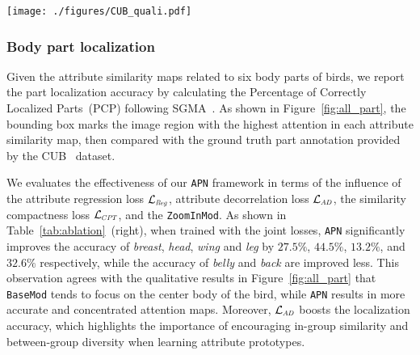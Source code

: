 \begin{figure*}[t]
  \centering
\texttt{[image: ./figures/CUB\_quali.pdf]}
    \caption{ Part and attribute localization on CUB.
        Left: 
        Attention maps for each body part of Mallard generated by our \texttt{APN}~(first row) and the baseline model \texttt{BaseMod} visualized by \texttt{CAM}~(\texttt{BaseMod(C)}, second row). Boxes mark out the area with the highest attention.
        Attention maps are min-max normalized for visualization.  Green~(purple) box outside the image indicates a correct~(incorrect) localization. 
}
  \label{fig:all_part}
\end{figure*}


\subsubsection{Body part localization}





Given the attribute similarity maps related to six body parts of birds, we report the part localization accuracy by calculating the Percentage of Correctly Localized Parts~(PCP) following SGMA~\citep{SGMA}. 
As shown in Figure~\ref{fig:all_part}, the bounding box marks 
the image region with the highest attention in each attribute similarity map, then compared with the ground truth part annotation provided by the CUB~\citep{26_wah2011caltech} dataset.

We evaluates the effectiveness of our \texttt{APN} framework in terms of the influence of the attribute regression loss $\mathcal{L}_{\Scale[0.6]{Reg}}$, attribute decorrelation loss $\mathcal{L}_{\Scale[0.6]{AD}}$, the similarity compactness loss $\mathcal{L}_{\Scale[0.6]{CPT}}$, and the \texttt{ZoomInMod}. 
As shown in Table~\ref{tab:ablation}~(right), when trained with the joint losses, \texttt{APN} significantly improves the accuracy of \textit{breast}, \textit{head}, \textit{wing} and \textit{leg} by $27.5\%$, $44.5\%$, $13.2\%$, and $32.6\%$ respectively, while the accuracy of \textit{belly} and \textit{back} are improved less. This observation agrees with the qualitative results in Figure~\ref{fig:all_part} that \texttt{BaseMod} tends to focus on the center body of the bird, while \texttt{APN} results in more accurate and concentrated attention maps. 
Moreover, $\mathcal{L}_{\Scale[0.6]{AD}}$ boosts the localization accuracy, which highlights the importance of encouraging in-group similarity and between-group diversity when learning attribute prototypes.



